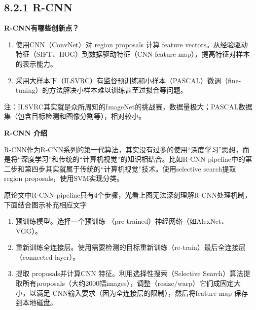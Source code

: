 \subsection{8.2.1 R-CNN}\label{r-cnn}

\textbf{R-CNN有哪些创新点？}

\begin{enumerate}
\def\labelenumi{\arabic{enumi}.}
\item
  使用CNN（ConvNet）对 region proposals 计算 feature
  vectors。从经验驱动特征（SIFT、HOG）到数据驱动特征（CNN feature
  map），提高特征对样本的表示能力。
\item
  采用大样本下（ILSVRC）有监督预训练和小样本（PASCAL）微调（fine-tuning）的方法解决小样本难以训练甚至过拟合等问题。
\end{enumerate}

注：ILSVRC其实就是众所周知的ImageNet的挑战赛，数据量极大；PASCAL数据集（包含目标检测和图像分割等），相对较小。

\textbf{R-CNN 介绍}

​
R-CNN作为R-CNN系列的第一代算法，其实没有过多的使用``深度学习''思想，而是将``深度学习''和传统的``计算机视觉''的知识相结合。比如R-CNN
pipeline中的第二步和第四步其实就属于传统的``计算机视觉''技术。使用selective
search提取region proposals，使用SVM实现分类。

\begin{figure}
\centering
\caption{}
\end{figure}

原论文中R-CNN
pipeline只有4个步骤，光看上图无法深刻理解R-CNN处理机制，下面结合图示补充相应文字

\begin{enumerate}
\def\labelenumi{\arabic{enumi}.}
\item
  预训练模型。选择一个预训练 （pre-trained）神经网络（如AlexNet、VGG）。
\item
  重新训练全连接层。使用需要检测的目标重新训练（re-train）最后全连接层（connected
  layer）。
\item
  提取 proposals并计算CNN 特征。利用选择性搜索（Selective
  Search）算法提取所有proposals（大约2000幅images），调整（resize/warp）它们成固定大小，以满足
  CNN输入要求（因为全连接层的限制），然后将feature map 保存到本地磁盘。
\end{enumerate}

\begin{figure}
\centering
\caption{}
\end{figure}


